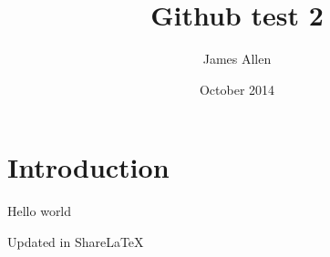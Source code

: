 \documentclass{article}
\title{Github test 2}
\author{James Allen}
\date{October 2014}
\begin{document}
\maketitle

\section{Introduction}

Hello world

Updated in ShareLaTeX
\end{document}
